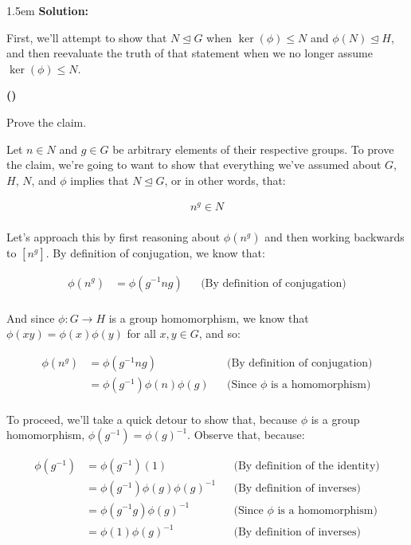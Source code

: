 \documentclass{article}
\newenvironment{solution}{
	\vspace{.5em}
	\par
	\begin{adjustwidth}{1.5em}{}
	\textbf{{Solution:}}
	\par
	\vspace{.5em}
}{
	\vspace{1em}
	\end{adjustwidth}
	\setcounter{step}{0}
	\newpage
}
\newcounter{step}
\renewcommand{\thestep}{\Roman{step}}
\newenvironment{step}{
	\refstepcounter{step}
	\vspace{1em}\par\noindent
	\ignorespaces\noindent\textbf{(\thestep)}
	\ignorespaces
}{
	\par
	\vspace{1.5em}
}
\begin{document}
\begin{solution}
	First, we'll attempt to show that $N \unlhd G$ when $\ker(\phi) \le N$ and $\phi(N) \unlhd H$, and then reevaluate the truth of that statement when we no longer assume $\ker(\phi) \le N$. \\

	\begin{step}
		Prove the claim.
	\end{step}

	Let $n \in N$ and $g \in G$ be arbitrary elements of their respective groups. To prove the claim, we're going to want to show that everything we've assumed about $G$, $H$, $N$, and $\phi$ implies that $N \unlhd G$, or in other words, that:

	\begin{align*}
		n^{g} \in N \\
	\end{align*}

	Let's approach this by first reasoning about $\phi(n^{g})$ and then working backwards to $[n^{g}]$. By definition of conjugation, we know that:

	\begin{align*}
		\phi(n^{g}) &= \phi(g^{-1}ng) &&\text{(By definition of conjugation)} \\
	\end{align*}

	And since $\phi \colon G \rightarrow H$ is a group homomorphism, we know that $\phi(xy) = \phi(x)\phi(y)$ for all $x, y \in G$, and so:

	\begin{align*}
		\phi(n^{g}) &= \phi(g^{-1}ng) &&\text{(By definition of conjugation)} \\
		&= \phi(g^{-1})\phi(n)\phi(g) &&\text{(Since $\phi$ is a homomorphism)} \\
	\end{align*}

	To proceed, we'll take a quick detour to show that, because $\phi$ is a group homomorphism, $\phi(g^{-1}) = \phi(g)^{-1}$. Observe that, because:

	\begin{align*}
		\phi(g^{-1}) &= \phi(g^{-1})(1) &&\text{(By definition of the identity)} \\
		&= \phi(g^{-1})\phi(g)\phi(g)^{-1} &&\text{(By definition of inverses)} \\
		&= \phi(g^{-1}g)\phi(g)^{-1} &&\text{(Since $\phi$ is a homomorphism)} \\
		&= \phi(1)\phi(g)^{-1} &&\text{(By definition of inverses)} \\
	\end{align*}


\end{solution}
\end{document}
